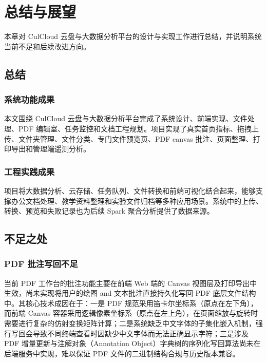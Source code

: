 \chapter{总结与展望}

本章对 CulCloud 云盘与大数据分析平台的设计与实现工作进行总结，并说明系统当前不足和后续改进方向。

\section{总结}

\subsection{系统功能成果}

本文围绕 CulCloud 云盘与大数据分析平台完成了系统设计、前端实现、文件处理、PDF 编辑室、任务监控和文档工程规划。项目实现了真实首页指标、拖拽上传、文件夹管理、文件分类、专门文件预览页、PDF canvas 批注、页面整理、打印导出和管理端遥测分析。

\subsection{工程实践成果}

项目将大数据分析、云存储、任务队列、文件转换和前端可视化结合起来，能够支撑办公文档处理、教学资料整理和实验文件归档等多种应用场景。系统中的上传、转换、预览和失败记录也为后续 Spark 聚合分析提供了数据来源。

\section{不足之处}

\subsection{PDF 批注写回不足}

当前 PDF 工作台的批注功能主要在前端 Web 端的 Canvas 视图层及打印导出中生效，尚未实现将用户的绘图 and 文本批注直接持久化写回 PDF 底层文件结构中。其核心技术成因在于：一是 PDF 规范采用笛卡尔坐标系（原点在左下角），而前端 Canvas 容器采用逻辑像素坐标系（原点在左上角），在页面缩放与旋转时需要进行复杂的仿射变换矩阵计算；二是系统缺乏中文字体的子集化嵌入机制，强行写回会导致不同终端查看时因缺少中文字体而无法正确显示字符；三是涉及 PDF 增量更新与注解对象（Annotation Object）字典树的序列化写回算法尚未在后端服务中实现，难以保证 PDF 文件的二进制结构合规与历史版本兼容。

